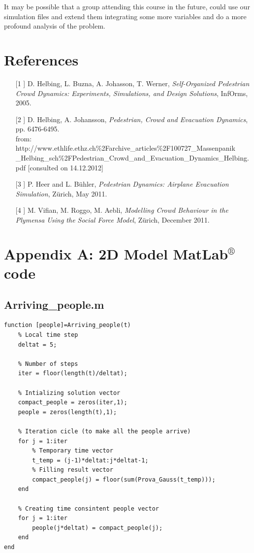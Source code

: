 \documentclass[11pt]{article}
\begin{document}
It may be possible that a group attending this course in the future, could use our simulation files and extend them integrating some more variables and do a more profound analysis of the problem.

\newpage
\section{References}

\begin{itemize}
	\item[[1]] D. Helbing, L. Buzna, A. Johasson, T. Werner, \emph{Self-Organized Pedestrian Crowd Dynamics: Experiments, Simulations, and Design Solutions}, InfOrms, 2005.
	\item[[2]] D. Helbing, A. Johansson, \emph{Pedestrian, Crowd and Evacuation Dynamics}, pp. 6476-6495.\\
	from: http://www.ethlife.ethz.ch\%2Farchive\_articles\%2F100727\_Massenpanik\\\_Helbing\_sch\%2FPedestrian\_Crowd\_and\_Evacuation\_Dynamics\_Helbing.pdf [consulted on 14.12.2012]
	\item[[3]] P. Heer and L. B\"uhler, \emph{Pedestrian Dynamics: Airplane Evacuation Simulation}, Z\"urich, May 2011.
	\item[[4]] M. Vifian, M. Roggo, M. Aebli, \emph{Modelling Crowd Behaviour in the Plymensa Using the Social Force Model}, Z\"urich, December 2011.
\end{itemize}


\newpage

\section{Appendix A: 2D Model MatLab$^{®}$ code}

\subsection*{Arriving\_people.m}
\begin{lstlisting}[frame=lines]
% Function for the creation of the number of agents
function [people]=Arriving_people(t)
    % Local time step
    deltat = 5;

    % Number of steps
    iter = floor(length(t)/deltat);
    
    % Intializing solution vector
    compact_people = zeros(iter,1);
    people = zeros(length(t),1);
    
    % Iteration cicle (to make all the people arrive)
    for j = 1:iter
        % Temporary time vector   
        t_temp = (j-1)*deltat:j*deltat-1;
        % Filling result vector    
        compact_people(j) = floor(sum(Prova_Gauss(t_temp)));
    end
    
    % Creating time consintent people vector
    for j = 1:iter
        people(j*deltat) = compact_people(j);
    end
end
\end{lstlisting}
\end{document}
